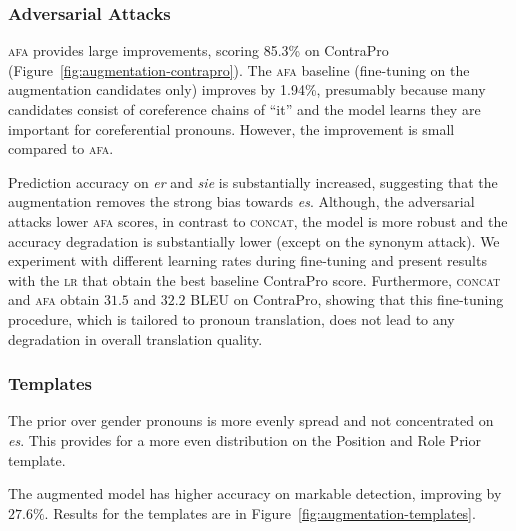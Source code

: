\subsubsection{Adversarial Attacks}

\textsc{afa} provides large improvements, scoring 85.3\% on ContraPro (Figure~\ref{fig:augmentation-contrapro}).
%
The \textsc{afa} baseline  (fine-tuning on the augmentation candidates only) improves by 1.94\%, presumably because many candidates consist of coreference chains of ``it'' and the model learns they are important for coreferential pronouns. However, the improvement is small compared to \textsc{afa}. 



Prediction accuracy on \textit{er} and \textit{sie} is substantially increased, suggesting that the augmentation removes the strong bias towards \textit{es}. %
%
Although, the adversarial attacks lower \textsc{afa} scores, 
in contrast to \textsc{concat}, the model is more robust and the accuracy degradation is substantially lower (except on the synonym attack).
% 
We experiment with different learning rates during fine-tuning and 
present results with the \textsc{lr} that obtain 
the  best  baseline ContraPro score.
%
Furthermore, \textsc{concat}  and \textsc{afa} obtain $31.5$  and $32.2$ \textsc{BLEU} on ContraPro, showing that this fine-tuning procedure, which is tailored to pronoun translation, does not lead to any degradation in overall translation quality.

\subsubsection{Templates}



The prior over gender pronouns is more evenly spread and not concentrated on \textit{es}.
%
This provides for a more even distribution on the Position and Role Prior template.

The augmented model has higher accuracy on markable detection, improving by $27.6\%$. 
%
Results for  the templates are in Figure~\ref{fig:augmentation-templates}.




